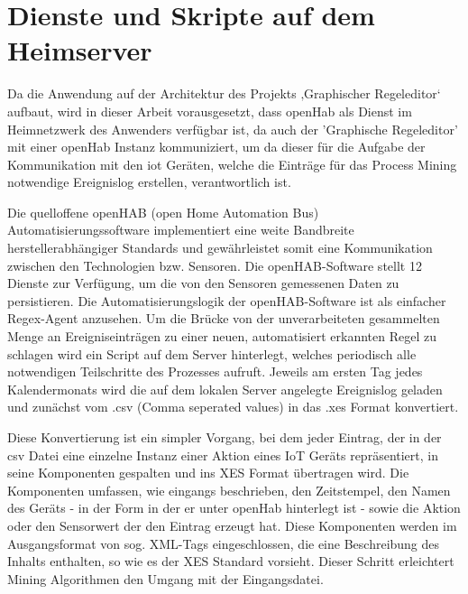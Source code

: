\section{Dienste und Skripte auf dem Heimserver}
Da die Anwendung auf der Architektur des Projekts ‚Graphischer Regeleditor‘ aufbaut, wird in dieser Arbeit vorausgesetzt, dass openHab als Dienst im Heimnetzwerk des Anwenders verfügbar ist, da auch der 'Graphische Regeleditor' mit einer openHab Instanz kommuniziert, um  da dieser für die Aufgabe der Kommunikation mit den iot Geräten, welche die Einträge für das Process Mining notwendige Ereignislog erstellen, verantwortlich ist. 

Die quelloffene openHAB (open Home Automation Bus) Automatisierungssoftware implementiert eine weite Bandbreite herstellerabhängiger Standards und gewährleistet somit eine Kommunikation zwischen den Technologien bzw. Sensoren. Die openHAB-Software stellt 12 Dienste zur Verfügung, um die von den Sensoren gemessenen Daten zu persistieren. Die Automatisierungslogik der openHAB-Software ist als einfacher Regex-Agent anzusehen. 
Um die Brücke von der unverarbeiteten gesammelten Menge an Ereigniseinträgen zu einer neuen, automatisiert erkannten Regel zu schlagen wird ein Script auf dem Server hinterlegt, welches periodisch alle notwendigen Teilschritte des Prozesses aufruft. Jeweils am ersten Tag jedes Kalendermonats wird die auf dem lokalen Server angelegte Ereignislog geladen und zunächst vom .csv (Comma seperated values) in das .xes Format konvertiert. 

Diese Konvertierung ist ein simpler Vorgang, bei dem jeder Eintrag, der in der csv Datei eine einzelne Instanz einer Aktion eines IoT Geräts repräsentiert, in seine Komponenten gespalten und ins XES Format übertragen wird. Die Komponenten umfassen, wie eingangs beschrieben, den Zeitstempel, den Namen des Geräts - in der Form in der er unter openHab hinterlegt ist - sowie die Aktion oder den Sensorwert der den Eintrag erzeugt hat. Diese Komponenten werden im Ausgangsformat von sog. XML-Tags eingeschlossen, die eine Beschreibung des Inhalts enthalten, so wie es der XES Standard vorsieht. Dieser Schritt erleichtert Mining Algorithmen den Umgang mit der Eingangsdatei. 


